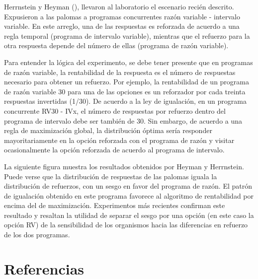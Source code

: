 \documentclass[
  letterpaper,
]{book}
\begin{document}
Herrnstein y Heyman (), llevaron al laboratorio el escenario recién
descrito. Expusieron a las palomas a programas concurrentes razón
variable - intervalo variable. En este arreglo, una de las respuestas es
reforzada de acuerdo a una regla temporal (programa de intervalo
variable), mientras que el refuerzo para la otra respuesta depende del
número de ellas (programa de razón variable).

Para entender la lógica del experimento, se debe tener presente que en
programas de razón variable, la rentabilidad de la respuesta es el
número de respuestas necesario para obtener un refuerzo. Por ejemplo, la
rentabilidad de un programa de razón variable 30 para una de las
opciones es un reforzador por cada treinta respuestas invertidas (1/30).
De acuerdo a la ley de igualación, en un programa concurrente RV30 -
IVx, el número de respuestas por refuerzo dentro del programa de
intervalo debe ser también de 30. Sin embargo, de acuerdo a una regla de
maximización global, la distribución óptima sería responder
mayoritariamente en la opción reforzada con el programa de razón y
visitar ocasionalmente la opción reforzada de acuerdo al programa de
intervalo.

La siguiente figura muestra los resultados obtenidos por Heyman y
Herrnstein. Puede verse que la distribución de respuestas de las palomas
iguala la distribución de refuerzos, con un sesgo en favor del programa
de razón. El patrón de igualación obtenido en este programa favorece al
algoritmo de rentabilidad por encima del de maximización. Experimentos
más recientes confirman este resultado y resaltan la utilidad de separar
el sesgo por una opción (en este caso la opción RV) de la sensibilidad
de los organismos hacia las diferencias en refuerzo de los dos
programas.


\chapter*{Referencias}\label{referencias}



\backmatter
\end{document}
